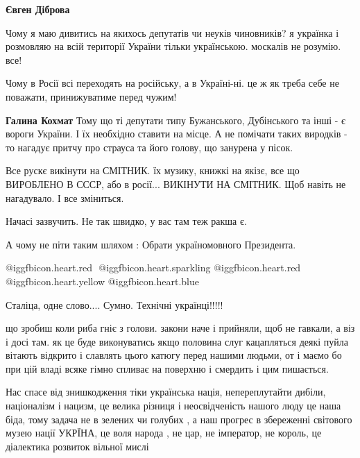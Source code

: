 \begin{itemize}
\begin{itemize}
\begin{itemize}
\textbf{Євген Діброва} 

Чому я маю дивитись на якихось депутатів чи неуків чиновників? я українка і
розмовляю на всій території України тільки українською. москалів не розумію. все!

Чому в Росії всі переходять на російську, а в Україні-ні. це ж як треба себе не
поважати, принижуватиме перед чужим!

\textbf{Галина Кохмат} Тому що ті депутати типу Бужанського, Дубінського та інші - є вороги України. І їх необхідно ставити на місце. А не помічати таких виродків - то нагадує притчу про страуса та його голову, що занурена у пісок.
\end{itemize} %

\end{itemize} %


Все рускє викінути на СМІТНИК. їх музику, книжкі на якізє, все що ВИРОБЛЕНО В
СССР, або в росії... ВИКІНУТИ НА СМІТНИК. Щоб навіть не нагадувало. І все
зміниться.

Начасі зазвучить. Не так швидко, у вас там теж ракша є.

А чому не піти таким шляхом : Обрати україномовного Президента.

@igg{fbicon.heart.red} ️  @igg{fbicon.heart.sparkling} @igg{fbicon.heart.red} @igg{fbicon.heart.yellow}  @igg{fbicon.heart.blue} 


Сталіца, одне слово.... Сумно. Технічні українці!!!!!


що зробиш коли риба гніє з голови. закони наче і прийняли, щоб не гавкали, а
віз і досі там. як це буде виконуватись якщо половина слуг кацапляться деякі
пуйла вітають відкрито і славлять цього катюгу перед нашими людьми, от і маємо
бо при цій владі всяке гімно спливає на поверхню і смердить і цим пишається.



Нас спасе від знишкодження тіки українська нація, непереплутайти дибіли,
націоналізм і нацизм, це велика різниця і неосвідченість нашого люду це наша
біда, тому задача не в зелених чи голубих , а наш прогрес в збереженні
світового музею нації УКРЇНА, це воля народа , не цар, не імператор, не король,
це діалектика розвиток вільної мислі


\end{itemize}

